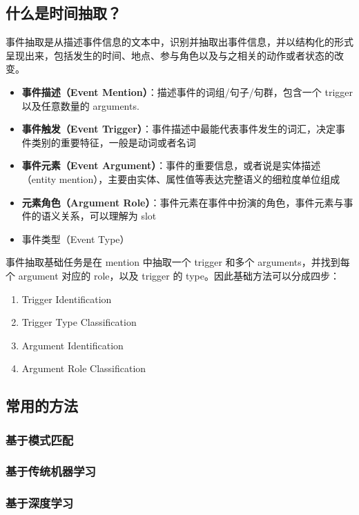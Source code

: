 \documentclass{article}
\begin{document}
\subsection{什么是时间抽取？}
事件抽取是从描述事件信息的文本中，识别并抽取出事件信息，并以结构化的形式呈现出来，包括发生的时间、地点、参与角色以及与之相关的动作或者状态的改变。
\begin{itemize}
    \item \textbf{事件描述（Event Mention）}：描述事件的词组/句子/句群，包含一个 trigger 以及任意数量的 arguments.
    \item \textbf{事件触发（Event Trigger）}：事件描述中最能代表事件发生的词汇，决定事件类别的重要特征，一般是动词或者名词
    \item \textbf{事件元素（Event Argument）}：事件的重要信息，或者说是实体描述（entity mention），主要由实体、属性值等表达完整语义的细粒度单位组成
    \item \textbf{元素角色（Argument Role）}：事件元素在事件中扮演的角色，事件元素与事件的语义关系，可以理解为 slot
    \item 事件类型（Event Type）
\end{itemize}
事件抽取基础任务是在 mention 中抽取一个 trigger 和多个 arguments，并找到每个 argument 对应的 role，以及 trigger 的 type。因此基础方法可以分成四步：
\begin{enumerate}
    \item Trigger Identification
    \item Trigger Type Classification
    \item Argument Identification
    \item Argument Role Classification
\end{enumerate}
\subsection{常用的方法}
\subsubsection{基于模式匹配}
\subsubsection{基于传统机器学习}
\subsubsection{基于深度学习}
\end{document}
